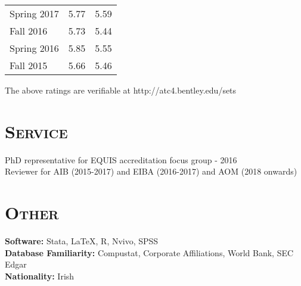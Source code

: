 \documentclass[margin, 12pt]{res}
\begin{document}
\begin{resume}
\begin{table}[htbp]
\begin{tabular}{lrr}
    Spring 2017 & 5.77  & 5.59 \\
    Fall 2016 & 5.73  & 5.44 \\
    Spring 2016 & 5.85  & 5.55 \\
    Fall 2015 & 5.66  & 5.46 \\
    \bottomrule


    \end{tabular}%
    
  The above ratings are verifiable at http://atc4.bentley.edu/sets    
  \label{tab:addlabel}%
\end{table}%
 
 \section{\normalfont\textsc{Service}}
PhD representative for EQUIS accreditation focus group - 2016 \\
Reviewer for AIB (2015-2017) and EIBA (2016-2017) and AOM (2018 onwards)




 
\section{\normalfont\textsc{Other}}
\textbf{Software:} Stata, \LaTeX, R, Nvivo, SPSS \\
\textbf{Database Familiarity:} Compustat, Corporate Affiliations, World Bank, SEC Edgar   \\
\textbf{Nationality:} Irish  \\

\end{resume}
\end{document}
